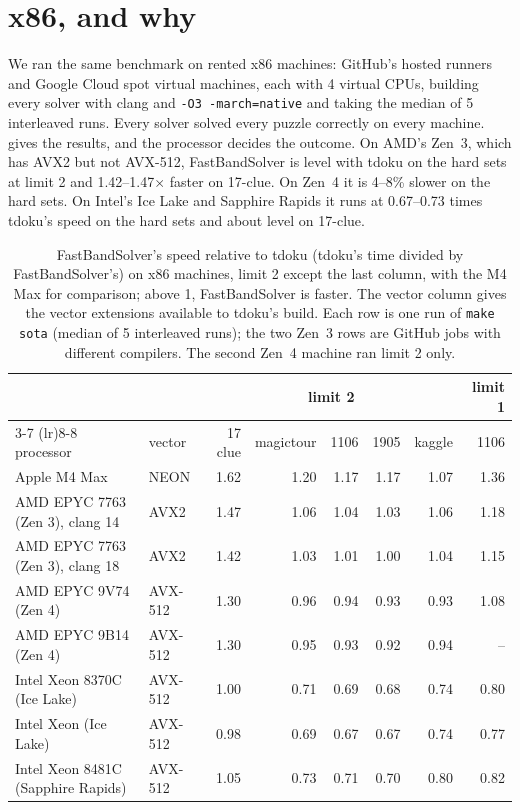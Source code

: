 \documentclass[11pt]{article}
\theoremstyle{definition}
\theoremstyle{plain}
\begin{document}
\section{x86, and why}
\label{sec:x86}

We ran the same benchmark on rented x86 machines: GitHub's hosted runners and Google Cloud spot virtual machines, each
with 4 virtual CPUs, building every solver with clang and \texttt{-O3 -march=native} and taking the median of 5
interleaved runs. Every solver solved every puzzle correctly on every machine.  gives the results, and
the processor decides the outcome. On AMD's Zen~3, which has AVX2 but not AVX-512, FastBandSolver is level with tdoku
on the hard sets at limit 2 and 1.42--1.47$\times$ faster on 17-clue. On Zen~4 it is 4--8\% slower on the hard sets.
On Intel's Ice Lake and Sapphire Rapids it runs at 0.67--0.73 times tdoku's speed on the hard sets and about level on
17-clue.

\begin{table}[t]
\centering
\caption{FastBandSolver's speed relative to tdoku (tdoku's time divided by FastBandSolver's) on x86 machines,
limit 2 except the last column, with the M4 Max for comparison; above 1, FastBandSolver is faster. The vector column
gives the vector extensions available to tdoku's build. Each row is one run of \texttt{make sota} (median of 5
interleaved runs); the two Zen~3 rows are GitHub jobs with different compilers. The second Zen~4 machine ran limit 2
only.}
\label{tab:x86}
\small
\setlength{\tabcolsep}{3.5pt}
\begin{tabular}{llrrrrrr}
\toprule
& & \multicolumn{5}{c}{limit 2} & limit 1 \\
\cmidrule(lr){3-7} \cmidrule(lr){8-8}
processor & vector & 17 clue & magictour & 1106 & 1905 & kaggle & 1106 \\
\midrule
Apple M4 Max & NEON & 1.62 & 1.20 & 1.17 & 1.17 & 1.07 & 1.36 \\
\midrule
AMD EPYC 7763 (Zen 3), clang 14 & AVX2 & 1.47 & 1.06 & 1.04 & 1.03 & 1.06 & 1.18 \\
AMD EPYC 7763 (Zen 3), clang 18 & AVX2 & 1.42 & 1.03 & 1.01 & 1.00 & 1.04 & 1.15 \\
AMD EPYC 9V74 (Zen 4) & AVX-512 & 1.30 & 0.96 & 0.94 & 0.93 & 0.93 & 1.08 \\
AMD EPYC 9B14 (Zen 4) & AVX-512 & 1.30 & 0.95 & 0.93 & 0.92 & 0.94 & -- \\
Intel Xeon 8370C (Ice Lake) & AVX-512 & 1.00 & 0.71 & 0.69 & 0.68 & 0.74 & 0.80 \\
Intel Xeon (Ice Lake) & AVX-512 & 0.98 & 0.69 & 0.67 & 0.67 & 0.74 & 0.77 \\
Intel Xeon 8481C (Sapphire Rapids) & AVX-512 & 1.05 & 0.73 & 0.71 & 0.70 & 0.80 & 0.82 \\
\bottomrule
\end{tabular}
\end{table}
\end{document}
